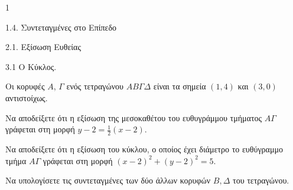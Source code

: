 \begin{ylh}{1}
    \item 1.4. Συντεταγμένες στο Επίπεδο
    \item 2.1. Εξίσωση Ευθείας
    \item 3.1 Ο Κύκλος.
\end{ylh}
Οι κορυφές $A$, $\Gamma$ ενός τετραγώνου $AB\Gamma\Delta$ είναι τα σημεία $(1,4)$ και $(3,0)$ αντιστοίχως.
\begin{alist}
\item Να αποδείξετε ότι η εξίσωση της μεσοκαθέτου του ευθυγράμμου τμήματος $A\Gamma$ γράφεται στη μορφή $y - 2 = \frac{1}{2}(x - 2)$. 
\item Να αποδείξετε ότι η εξίσωση του κύκλου, ο οποίος έχει διάμετρο το ευθύγραμμο τμήμα $A\Gamma$ γράφεται στη μορφή $(x - 2)^2 + (y - 2)^2 = 5$. 
\item Να υπολογίσετε τις συντεταγμένες των δύο άλλων κορυφών $B,\Delta$ του τετραγώνου. 
\end{alist}